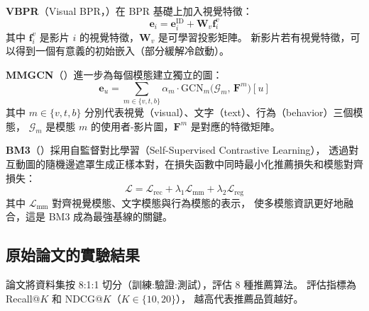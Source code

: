 \documentclass[12pt, a4paper]{article}
\begin{document}
\textbf{VBPR}（Visual BPR，\citealt{he2016vbpr}）在 BPR 基礎上加入視覺特徵：
\begin{equation}
\mathbf{e}_i = \mathbf{e}_i^{\text{ID}} + \mathbf{W}_v \mathbf{f}_i^v
\end{equation}
其中 $\mathbf{f}_i^v$ 是影片 $i$ 的視覺特徵，$\mathbf{W}_v$ 是可學習投影矩陣。
新影片若有視覺特徵，可以得到一個有意義的初始嵌入（部分緩解冷啟動）。

\textbf{MMGCN}（\citealt{wei2019mmgcn}）進一步為每個模態建立獨立的圖：
\begin{equation}
\mathbf{e}_u = \sum_{m \in \{v, t, b\}} \alpha_m \cdot \mathrm{GCN}_m\!\bigl(\mathcal{G}_m,\, \mathbf{F}^m\bigr)[u]
\end{equation}
其中 $m \in \{v, t, b\}$ 分別代表視覺（visual）、文字（text）、行為（behavior）三個模態，
$\mathcal{G}_m$ 是模態 $m$ 的使用者-影片圖，$\mathbf{F}^m$ 是對應的特徵矩陣。

\textbf{BM3}（\citealt{zhou2023bootstrap}）採用自監督對比學習（Self-Supervised Contrastive Learning），
透過對互動圖的隨機邊遮罩生成正樣本對，在損失函數中同時最小化推薦損失和模態對齊損失：
\begin{equation}
\mathcal{L} = \mathcal{L}_{\text{rec}} + \lambda_1 \mathcal{L}_{\text{mm}} + \lambda_2 \mathcal{L}_{\text{reg}}
\end{equation}
其中 $\mathcal{L}_{\text{mm}}$ 對齊視覺模態、文字模態與行為模態的表示，
使多模態資訊更好地融合，這是 BM3 成為最強基線的關鍵。

\subsection{原始論文的實驗結果}

論文將資料集按 8:1:1 切分（訓練:驗證:測試），評估 8 種推薦算法。
評估指標為 Recall@$K$ 和 NDCG@$K$（$K \in \{10, 20\}$），
越高代表推薦品質越好。
\end{document}
